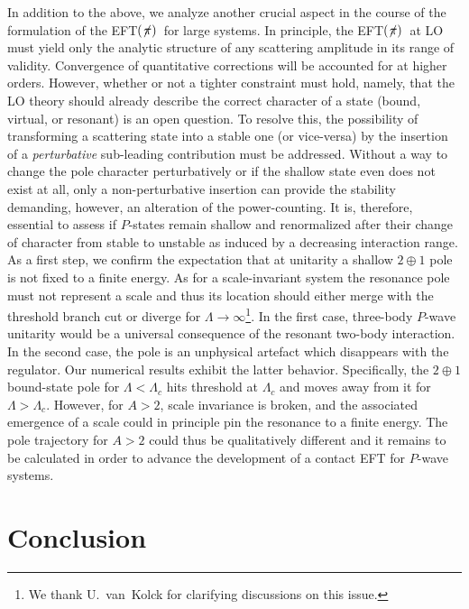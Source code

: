 \documentclass[onecolumn,preprint,superscriptaddress,nofootinbib]{revtex4-1}
\newcommand{\lc}{\ensuremath{\Lambda_c}}
\newcommand{\eftnopi}{\mbox{EFT$(\not \! \pi)$}}
\begin{document}
In addition to the above, we analyze another crucial aspect in the course of the
formulation of the \eftnopi~for large systems.
In principle, the \eftnopi~at LO must yield only the analytic structure of any scattering amplitude
in its range of validity. Convergence of quantitative corrections will be accounted for at
higher orders.
However, whether or not a tighter constraint must hold, namely, that the LO theory should
already describe the correct character of a state (bound, virtual, or resonant) is an open question.
To resolve this, the possibility of transforming a scattering state into a stable
one (or vice-versa) by the insertion of a \textit{perturbative} sub-leading contribution must be addressed.
Without a way to change the pole character perturbatively or if the shallow state even does not exist at all,
only a non-perturbative insertion can provide the stability demanding, however, 
an alteration of the power-counting.
It is, therefore, essential to assess if $P$-states remain shallow and renormalized
after their change of character from stable to unstable as induced by a decreasing interaction range.
As a first step, we confirm the expectation that at unitarity a shallow $2\oplus1$ pole is not fixed to a finite energy.
As for a scale-invariant system the resonance pole must not represent a scale and thus its location should either
merge with the threshold branch cut or diverge for $\Lambda\to\infty$\footnote{We thank U.~van~Kolck for clarifying discussions on this issue.}.
In the first case, three-body $P$-wave unitarity would be a universal consequence of the resonant two-body interaction. 
In the second case, the pole is an unphysical artefact which disappears with the regulator.
Our numerical results exhibit the latter behavior. Specifically, the $2\oplus1$ bound-state pole for $\Lambda<\lc$ hits threshold at $\lc$ and
moves away from it for $\Lambda>\lc$.
However, for $A>2$, scale invariance is broken, and the associated emergence of a scale could in principle
pin the resonance to a finite energy. The pole trajectory for $A>2$ could thus be qualitatively different and
it remains to be calculated in order to advance the development of a contact EFT for $P$-wave systems.



\section*{Conclusion}
\end{document}
